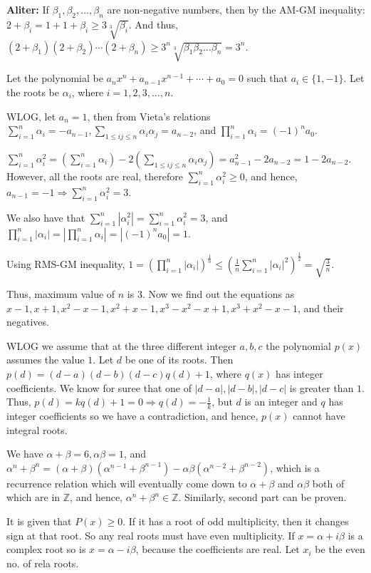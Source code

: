   {\bf Aliter:} If $\beta_1, \beta_2, \ldots, \beta_n$ are non-negative numbers, then by the AM-GM
  inequality: $2 + \beta_i = 1 + 1 + \beta_i\geq 3\sqrt[3]{\beta_i}$. And thus, $(2 + \beta_1)(2 + \beta_2)
  \cdots (2 + \beta_n)\geq 3^n\sqrt[3]{\beta_1\beta_2\ldots\beta_n} = 3^n$.
\item Let the polynomial be $a_nx^n + a_{n - 1}x^{n - 1} + \cdots + a_0 = 0$ such that $a_i\in\{1,
  -1\}$. Let the roots be $\alpha_i$, where $i = 1, 2, 3, \ldots, n$.

  WLOG, let $a_n = 1$, then from Vieta's relations $\displaystyle\sum_{i=1}^n\alpha_i = -a_{n - 1}, \sum_{1\leq ij\leq
    n}\alpha_i\alpha_j = a_{n - 2}$, and $\displaystyle\prod_{i=1}^n\alpha_i = (-1)^na_0$.

  $\displaystyle\sum_{i=1}^n\alpha_i^2 = \left(\sum_{i = 1}^n\alpha_i\right) - 2\left(\sum_{1\leq ij\leq
    n}\alpha_i\alpha_j\right) = a_{n - 1}^2 - 2a_{n - 2} = 1 - 2a_{n - 2}$. However, all the roots are real,
  therefore $\displaystyle\sum_{i=1}^n\alpha_i^2\geq 0$, and hence, $\displaystyle a_{n - 1} = -1\Rightarrow \sum_{i=1}^n\alpha_i^2 =
  3$.

  We also have that $\displaystyle\sum_{i=1}^n|\alpha_i^2| = \sum_{i=1}^n\alpha_i^2 = 3$, and
  $\displaystyle\prod_{i = 1}^n|\alpha_i|
  = \left|\prod_{i = 1}^n\alpha_i\right| = |(-1)^na_0| = 1$.

  Using RMS-GM inequality, $\displaystyle1 = \left(\prod_{i =
    1}^n|\alpha_i|\right)^{\frac{1}{n}}\leq\left(\frac{1}{n}\sum_{i= 1}^n|\alpha_i|^2\right)^{\frac{1}{2}} =
  \sqrt{\frac{3}{n}}$.

  Thus, maximum value of $n$ is $3$. Now we find out the equations as $x - 1, x + 1, x^2 - x - 1, x^2 + x -
  1, x^3 - x^2 - x + 1, x^3 + x^2 - x - 1$, and their negatives.
\item WLOG we assume that at the three different integer $a, b, c$ the polynomial $p(x)$ assumes the value
  $1$. Let $d$ be one of its roots. Then $p(d) = (d - a)(d - b)(d - c)q(d) + 1$, where $q(x)$ has integer
  coefficients. We know for suree that one
  of $|d - a|, |d - b|, |d - c|$ is greater than $1$. Thus, $p(d) = kq(d) + 1 = 0\Rightarrow q(d) =
  -\frac{1}{k}$, but $d$ is an integer and $q$ has integer coefficients so we have a contradiction, and
  hence, $p(x)$ cannot have integral roots.
\item We have $\alpha + \beta = 6, \alpha\beta = 1$, and $\alpha^n + \beta^n = (\alpha + \beta)(\alpha^{n -
  1} + \beta^{n - 1}) - \alpha\beta(\alpha^{n - 2} + \beta^{n - 2})$, which is a recurrence relation which
  will eventually come down to $\alpha + \beta$ and $\alpha\beta$ both of which are in $\mathbb{Z}$, and
  hence, $\alpha^n + \beta^n\in\mathbb{Z}$. Similarly, second part can be proven.
\item It is given that $P(x)\geq 0$. If it has a root of odd multiplicity, then it changes sign at that
  root. So any real roots must have even multiplicity. If $x = \alpha + i\beta$ is a complex root so is $x =
  \alpha - i\beta$, because the coefficients are real. Let $x_i$ be the even no. of rela roots.

